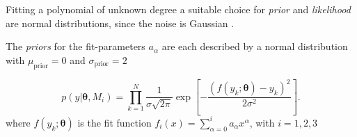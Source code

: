 \documentclass[11pt,aspectratio=1610,dvipsnames]{beamer}
\newcommand{\btheta}{\boldsymbol{\theta}}
\begin{document}
\begin{frame}{Fitting a polynomial of unknown degree}
	a suitable choice for \emph{prior} and \emph{likelihood} are normal distributions, since the noise is Gaussian \citet{sivia}.
		\begin{tcolorbox}[colback=black!5,colframe=gray!15!black,title=Choosing a prior]
		The \emph{priors} for the fit-parameters $a_\alpha$  are each described by a normal distribution with $\mu_{\text{prior}}=0$ and $\sigma_{\text{prior}}=2$
	\end{tcolorbox}

		\begin{tcolorbox}[colback=black!5,colframe=gray!15!black,title=Choosing a likelihood]
			$$p(y|\btheta, M_i)=\prod_{k=1}^{N}\frac{1}{\sigma\sqrt{2\pi}}\exp{\left[-\frac{(f(y_k;\btheta)-y_k)^2}{2\sigma^2}\right]}.$$
			where $f(y_k;\btheta)$ is the fit function $f_i(x)=\displaystyle\sum_{\alpha=0}^{i}a_\alpha x^\alpha$, with $i=1,2,3$
	\end{tcolorbox}
\end{frame}
\end{document}
